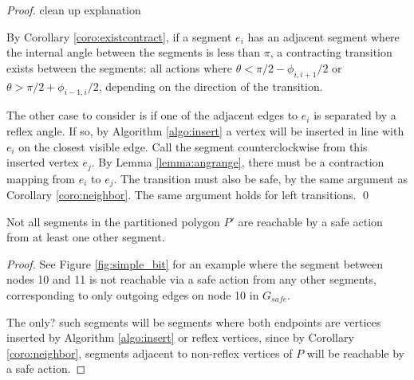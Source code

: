 \documentclass[]{styles/svproc}  %
\begin{document}
\begin{proof}

{\color{red} clean up explanation}

By Corollary \ref{coro:existcontract}, if a segment $e_i$ has an adjacent segment
where the internal angle between the segments is less than $\pi$, a contracting
transition exists between the segments: all actions where $\theta < \pi/2 -
\phi_{i,i+1}/2$ or $\theta > \pi/2 + \phi_{i-1,i}/2$, depending on the direction
of the transition.

The other case to consider is if one of the adjacent edges to $e_i$ is
separated by a reflex angle. If so, by Algorithm \ref{algo:insert} a vertex
will be inserted in line with $e_i$ on the closest visible edge. Call the
segment counterclockwise from this inserted vertex $e_j$. 
By Lemma
\ref{lemma:angrange}, there must be a contraction mapping from $e_i$ to $e_j$.
The transition must also be safe, by the same argument as Corollary
\ref{coro:neighbor}. The same argument holds for left transitions.
\qed
\end{proof}

\begin{lemma}
Not all segments in the partitioned polygon $P'$ are reachable by a safe action from
at least one other segment.
\end{lemma}

\begin{proof}
See Figure \ref{fig:simple_bit} for an example where the segment between nodes
10 and 11 is not reachable via a safe action from any other segments,
corresponding to only outgoing edges on node 10 in $G_{safe}$.

The {\color{red}only?} such segments will be
segments where both endpoints are vertices inserted by Algorithm
\ref{algo:insert} or reflex vertices, since by Corollary \ref{coro:neighbor},
segments adjacent to non-reflex vertices of $P$ will be reachable by a safe
action.
\end{proof}
\end{document}
